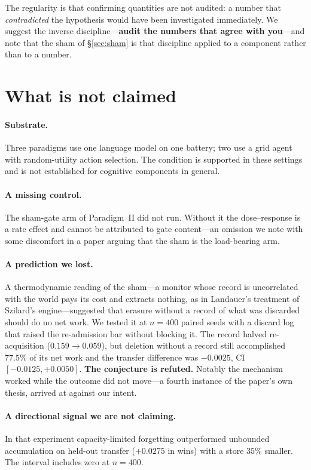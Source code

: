 \documentclass[11pt]{article}
\begin{document}
\noindent
The regularity is that confirming quantities are not audited: a number that
\emph{contradicted} the hypothesis would have been investigated immediately. We
suggest the inverse discipline---\textbf{audit the numbers that agree with
you}---and note that the sham of \S\ref{sec:sham} is that discipline applied to
a component rather than to a number.

\section{What is not claimed}
\label{sec:notclaimed}

\paragraph{Substrate.} Three paradigms use one language model on one battery;
two use a grid agent with random-utility action selection. The condition is
supported in these settings and is not established for cognitive components in
general.

\paragraph{A missing control.} The sham-gate arm of Paradigm~II did not run.
Without it the dose--response is a rate effect and cannot be attributed to gate
content---an omission we note with some discomfort in a paper arguing that the
sham is the load-bearing arm.

\paragraph{A prediction we lost.} A thermodynamic reading of the sham---a
monitor whose record is uncorrelated with the world pays its cost and extracts
nothing, as in Landauer's treatment of Szilard's engine---suggested that
erasure without a record of what was discarded should do no net work. We tested
it at $n=400$ paired seeds with a discard log that raised the re-admission bar
without blocking it. The record halved re-acquisition ($0.159 \to 0.059$), but
deletion without a record still accomplished $77.5\%$ of its net work and the
transfer difference was $-0.0025$, CI $[-0.0125,+0.0050]$. \textbf{The
conjecture is refuted.} Notably the mechanism worked while the outcome did not
move---a fourth instance of the paper's own thesis, arrived at against our
intent.

\paragraph{A directional signal we are not claiming.} In that experiment
capacity-limited forgetting outperformed unbounded accumulation on held-out
transfer ($+0.0275$ in wins) with a store $35\%$ smaller. The interval includes
zero at $n=400$.
\end{document}
